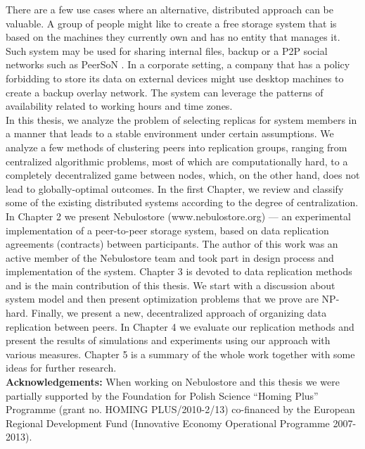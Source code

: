 \documentclass{pracamgren}
\begin{document}
There are a few use cases where an alternative, distributed approach can be valuable. A group of people might like to create a free storage system that is based on the machines they currently own and has no entity that manages it. Such system may be used for sharing internal files, backup or a P2P social networks such as PeerSoN \cite{peerson}. In a corporate setting, a company that has a policy forbidding to store its data on external devices might use desktop machines to create a backup overlay network. The system can leverage the patterns of availability related to working hours and time zones.\\

In this thesis, we analyze the problem of selecting replicas for system members in a manner that leads to a stable environment under certain assumptions.
We analyze a few methods of clustering peers into replication groups, ranging from centralized algorithmic problems, most of which are computationally hard, to a completely decentralized game between nodes, which, on the other hand, does not lead to globally-optimal outcomes.
In the first Chapter, we review and classify some of the existing distributed systems according to the degree of centralization. In Chapter 2 we present Nebulostore (www.nebulostore.org) --- an experimental implementation of a peer-to-peer storage system, based on data replication agreements (contracts) between participants. The author of this work was an active member of the Nebulostore team and took part in design process and implementation of the system. Chapter 3 is devoted to data replication methods and is the main contribution of this thesis. We start with a discussion about system model and then present optimization problems that we prove are NP-hard. Finally, we present a new, decentralized approach of organizing data replication between peers. In Chapter 4 we evaluate our replication methods and present the results of simulations and experiments using our approach with various measures. Chapter 5 is a summary of the whole work together with some ideas for further research.\\

{\bf Acknowledgements:} When working on Nebulostore and this thesis we were partially supported by the
Foundation for Polish Science “Homing Plus” Programme
(grant no. HOMING PLUS/2010-2/13) co-financed by the
European Regional Development Fund (Innovative Economy
Operational Programme 2007-2013).\\

%
%
%
%
\end{document}
